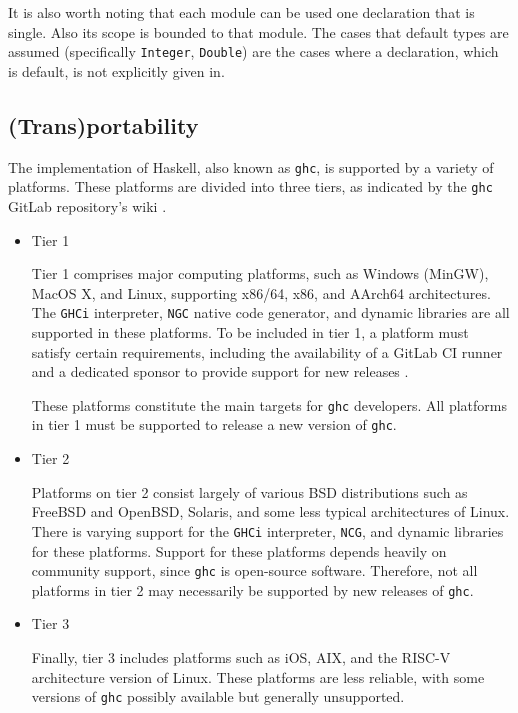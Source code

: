 \documentclass[a4paper, titlepage, twoside]{article}
\begin{document}
It is also worth noting that each module can be used one declaration that is single. Also its scope is bounded to that module. The cases that default types are assumed (specifically \texttt{Integer}, \texttt{Double}) are the cases where a declaration, which is default, is not explicitly given in.

\subsection{(Trans)portability}
\label{sec:org842783e}

The implementation of Haskell, also known as \texttt{ghc}, is supported by a variety of platforms. These platforms are divided into three tiers, as indicated by the \texttt{ghc} GitLab repository's wiki \autocite{gamariPlatformsGlasgowHaskell2023}.

\begin{itemize}
\item Tier 1

Tier 1 comprises major computing platforms, such as Windows (MinGW), MacOS X, and Linux, supporting x86/64, x86, and AArch64 architectures. The \texttt{GHCi} interpreter, \texttt{NGC} native code generator, and dynamic libraries are all supported in these platforms. To be included in tier 1, a platform must satisfy certain requirements, including the availability of a GitLab CI runner and a dedicated sponsor to provide support for new releases \autocite{gamariPlatformsGlasgowHaskell2023}.

These platforms constitute the main targets for \texttt{ghc} developers. All platforms in tier 1 must be supported to release a new version of \texttt{ghc}.

\item Tier 2

Platforms on tier 2 consist largely of various BSD distributions such as FreeBSD and OpenBSD, Solaris, and some less typical architectures of Linux. There is varying support for the \texttt{GHCi} interpreter, \texttt{NCG}, and dynamic libraries for these platforms. Support for these platforms depends heavily on community support, since \texttt{ghc} is open-source software. Therefore, not all platforms in tier 2 may necessarily be supported by new releases of \texttt{ghc}.

\item Tier 3

Finally, tier 3 includes platforms such as iOS, AIX, and the RISC-V architecture version of Linux. These platforms are less reliable, with some versions of \texttt{ghc} possibly available but generally unsupported.
\end{itemize}
\end{document}
